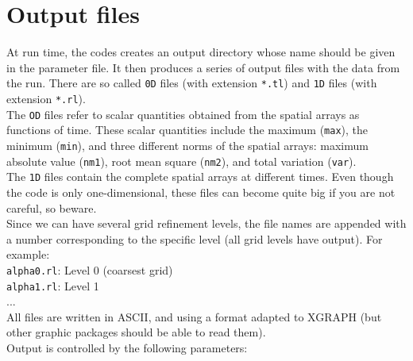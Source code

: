 \documentclass[12pt]{article}
\begin{document}

\section{Output files}

At run time, the codes creates an output directory whose name
should be given in the parameter file. It then produces a series of
output files with the data from the run. There are so called
\texttt{0D} files (with extension \texttt{*.tl}) and \texttt{1D} files
  (with extension \texttt{*.rl}). \\

The \texttt{OD} files refer to scalar quantities obtained from the
spatial arrays as functions of time. These scalar quantities include
the maximum (\texttt{max}), the minimum (\texttt{min}), and three
different norms of the spatial arrays: maximum absolute value
(\texttt{nm1}), root mean square (\texttt{nm2}), and total variation
(\texttt{var}). \\

The \texttt{1D} files contain the complete spatial arrays at different
times.  Even though the code is only one-dimensional, these files can
become quite big if you are not careful, so beware. \\

Since we can have several grid refinement levels, the file names are
appended with a number corresponding to the specific level (all grid
levels have output). For example: \\

\texttt{alpha0.rl}: \hspace{5mm} Level 0 (coarsest grid) \\
\texttt{alpha1.rl}: \hspace{5mm} Level 1 \\
... \\

All files are written in ASCII, and using a format adapted to XGRAPH
(but other graphic packages should be able to read them).\\

Output is controlled by the following parameters:
\end{document}
